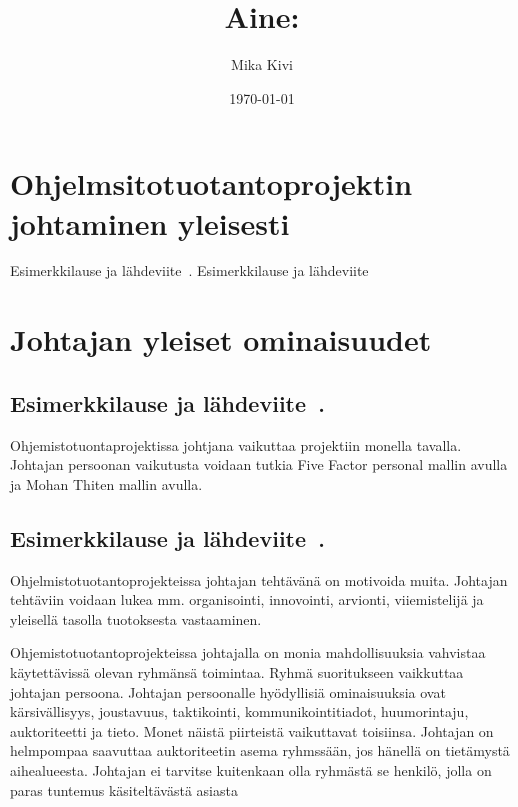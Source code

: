 \documentclass[finnish]{tktltiki2}
\title{Aine:}
\author{Mika Kivi}
\date{\today}
\theoremstyle{definition}
\theoremstyle{remark}
\begin{document}

\maketitle        %
\makeabstract     %

\tableofcontents  %
\newpage          %



\section{Ohjelmsitotuotantoprojektin johtaminen yleisesti}

Esimerkkilause ja lähdeviite~\cite{Guo:2008:SSP:1414004.1414046}.
Esimerkkilause ja lähdeviite~\cite{Wang:2010:PPP:1810295.1810302}

\section{Johtajan yleiset ominaisuudet}

\subsection{Esimerkkilause ja lähdeviite~\cite{Wang:2009:PMP:1639950.1640049}.}

Ohjemistotuontaprojektissa johtjana vaikuttaa projektiin monella tavalla. Johtajan persoonan vaikutusta voidaan tutkia Five Factor personal mallin avulla ja Mohan Thiten mallin avulla. 


\subsection{Esimerkkilause ja lähdeviite~\cite{4017705}.}

Ohjelmistotuotantoprojekteissa johtajan tehtävänä on motivoida muita. Johtajan tehtäviin voidaan lukea mm. organisointi, innovointi, arvionti, viiemistelijä  ja yleisellä tasolla tuotoksesta vastaaminen. 

Ohjemistotuotantoprojekteissa johtajalla on monia mahdollisuuksia vahvistaa käytettävissä olevan ryhmänsä toimintaa. Ryhmä suoritukseen vaikkuttaa johtajan persoona. Johtajan persoonalle hyödyllisiä ominaisuuksia ovat kärsivällisyys, joustavuus, taktikointi, kommunikointitiadot, huumorintaju, auktoriteetti ja tieto. Monet näistä piirteistä vaikuttavat toisiinsa. Johtajan on helmpompaa saavuttaa auktoriteetin asema ryhmssään, jos hänellä on tietämystä aihealueesta. Johtajan ei tarvitse kuitenkaan olla ryhmästä se henkilö, jolla on paras tuntemus käsiteltävästä asiasta 
\end{document}
